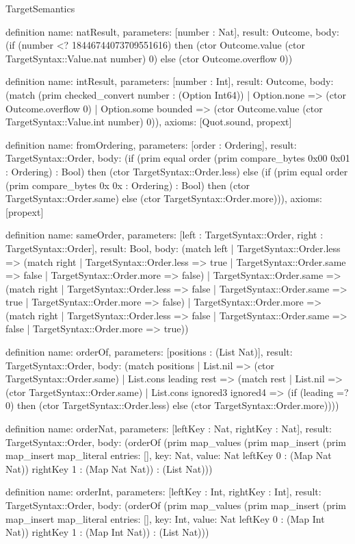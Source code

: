 \begin{lexlean}{TargetSemantics}
\begin{semanticmodule}
definition{
  name: natResult,
  parameters: [number : Nat],
  result: Outcome,
  body: (if (number <? 18446744073709551616) then (ctor Outcome.value (ctor TargetSyntax::Value.nat number) 0) else (ctor Outcome.overflow 0))
}

definition{
  name: intResult,
  parameters: [number : Int],
  result: Outcome,
  body: (match (prim checked_convert number : (Option Int64))
    | Option.none => (ctor Outcome.overflow 0)
    | Option.some bounded => (ctor Outcome.value (ctor TargetSyntax::Value.int number) 0)),
  axioms: [Quot.sound, propext]
}

definition{
  name: fromOrdering,
  parameters: [order : Ordering],
  result: TargetSyntax::Order,
  body: (if (prim equal order (prim compare_bytes 0x00 0x01 : Ordering) : Bool) then (ctor TargetSyntax::Order.less) else (if (prim equal order (prim compare_bytes 0x 0x : Ordering) : Bool) then (ctor TargetSyntax::Order.same) else (ctor TargetSyntax::Order.more))),
  axioms: [propext]
}

definition{
  name: sameOrder,
  parameters: [left : TargetSyntax::Order, right : TargetSyntax::Order],
  result: Bool,
  body: (match left
    | TargetSyntax::Order.less => (match right
      | TargetSyntax::Order.less => true
      | TargetSyntax::Order.same => false
      | TargetSyntax::Order.more => false)
    | TargetSyntax::Order.same => (match right
      | TargetSyntax::Order.less => false
      | TargetSyntax::Order.same => true
      | TargetSyntax::Order.more => false)
    | TargetSyntax::Order.more => (match right
      | TargetSyntax::Order.less => false
      | TargetSyntax::Order.same => false
      | TargetSyntax::Order.more => true))
}

definition{
  name: orderOf,
  parameters: [positions : (List Nat)],
  result: TargetSyntax::Order,
  body: (match positions
    | List.nil => (ctor TargetSyntax::Order.same)
    | List.cons leading rest => (match rest
      | List.nil => (ctor TargetSyntax::Order.same)
      | List.cons ignored3 ignored4 => (if (leading =? 0) then (ctor TargetSyntax::Order.less) else (ctor TargetSyntax::Order.more))))
}

definition{
  name: orderNat,
  parameters: [leftKey : Nat, rightKey : Nat],
  result: TargetSyntax::Order,
  body: (orderOf (prim map_values (prim map_insert (prim map_insert map_literal{
    entries: [],
    key: Nat,
    value: Nat
  } leftKey 0 : (Map Nat Nat)) rightKey 1 : (Map Nat Nat)) : (List Nat)))
}

definition{
  name: orderInt,
  parameters: [leftKey : Int, rightKey : Int],
  result: TargetSyntax::Order,
  body: (orderOf (prim map_values (prim map_insert (prim map_insert map_literal{
    entries: [],
    key: Int,
    value: Nat
  } leftKey 0 : (Map Int Nat)) rightKey 1 : (Map Int Nat)) : (List Nat)))
}


\end{semanticmodule}
\end{lexlean}
